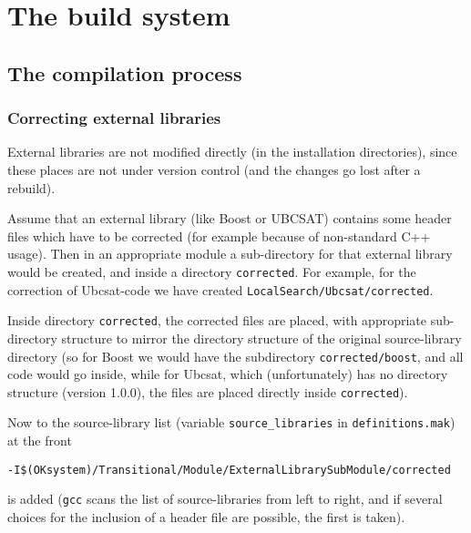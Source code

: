 \documentclass{book}
\newcommand{\filename}[1]{\texttt{#1}}
\newcommand{\name}[1]{\texttt{#1}}
\begin{document}
\part{The build system}
\label{par:Build}




\chapter{The compilation process}
\label{cha:BuildCompilation}

\section{Correcting external libraries}
\label{sec:Correctingexternallibraries}

External libraries are not modified directly (in the installation directories), since these places are not under version control (and the changes go lost after a rebuild).

Assume that an external library (like Boost or UBCSAT) contains some header files which have to be corrected (for example because of non-standard C++ usage). Then in an appropriate module a sub-directory for that external library would be created, and inside a directory \filename{corrected}. For example, for the correction of Ubcsat-code we have created \filename{LocalSearch/Ubcsat/corrected}.

Inside directory \filename{corrected}, the corrected files are placed, with appropriate sub-directory structure to mirror the directory structure of the original source-library directory (so for Boost we would have the subdirectory \filename{corrected/boost}, and all code would go inside, while for Ubcsat, which (unfortunately) has no directory structure (version 1.0.0), the files are placed directly inside \filename{corrected}).

Now to the source-library list (variable \name{source\_libraries} in \filename{definitions.mak}) at the front 
\begin{verbatim}
-I$(OKsystem)/Transitional/Module/ExternalLibrarySubModule/corrected
\end{verbatim} is added (\name{gcc} scans the list of source-libraries from left to right, and if several choices for the inclusion of a header file are possible, the first is taken).
\end{document}
